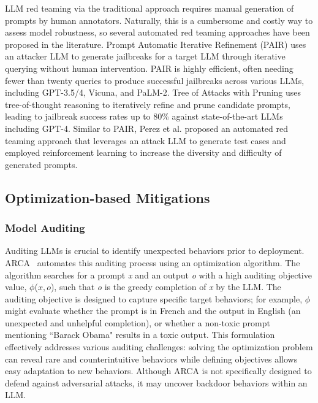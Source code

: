 LLM red teaming via the traditional approach requires manual generation of prompts by human annotators. Naturally, this is a cumbersome and costly way to assess model robustness, so several automated red teaming approaches have been proposed in the literature. Prompt Automatic Iterative Refinement (PAIR) \cite{chao_2023a} uses an attacker LLM to generate jailbreaks for a target LLM through iterative querying without human intervention. PAIR is highly efficient, often needing fewer than twenty queries to produce successful jailbreaks across various LLMs, including GPT-3.5/4, Vicuna, and PaLM-2. Tree of Attacks with Pruning \cite{mehrotra_2023a} uses tree-of-thought reasoning to iteratively refine and prune candidate prompts, leading to jailbreak success rates up to 80\% against state-of-the-art LLMs including GPT-4. Similar to PAIR, Perez et al. \cite{chao_2023a} proposed an automated red teaming approach that leverages an attack LLM to generate test cases and employed reinforcement learning to increase the diversity and difficulty of generated prompts.

\subsection{Optimization-based Mitigations}

\subsubsection{Model Auditing}

Auditing LLMs is crucial to identify unexpected behaviors prior to deployment. ARCA~\cite{jones_2023a} automates this auditing process using an optimization algorithm. The algorithm searches for a prompt \textit{x} and an output \textit{o} with a high auditing objective value, $\phi$($x,o$), such that \textit{o} is the greedy completion of \textit{x} by the LLM. The auditing objective is designed to capture specific target behaviors; for example, $\phi$ might evaluate whether the prompt is in French and the output in English (an unexpected and unhelpful completion), or whether a non-toxic prompt mentioning ``Barack Obama" results in a toxic output. This formulation effectively addresses various auditing challenges: solving the optimization problem can reveal rare and counterintuitive behaviors while defining objectives allows easy adaptation to new behaviors. Although ARCA is not specifically designed to defend against adversarial attacks, it may uncover backdoor behaviors within an LLM.

